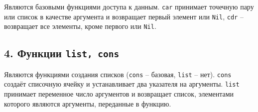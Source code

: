 Являются базовыми функциями доступа к данным. {\texttt{car}} принимает точечную пару или список в качестве аргумента и возвращает первый элемент или {\texttt{Nil}}, {\texttt{cdr}} -- возвращает все элементы, кроме первого или {\texttt{Nil}}.

\subsection*{4. Функции {\texttt{list, cons}}}

Являются функциями создания списков ({\texttt{cons}} -- базовая, {\texttt{list}} -- нет). {\texttt{cons}} создаёт списочную ячейку и устанавливает два указателя на аргументы. {\texttt{list}} принимает переменное число аргументов и возвращает список, элементами которого являются аргументы, переданные в функцию.